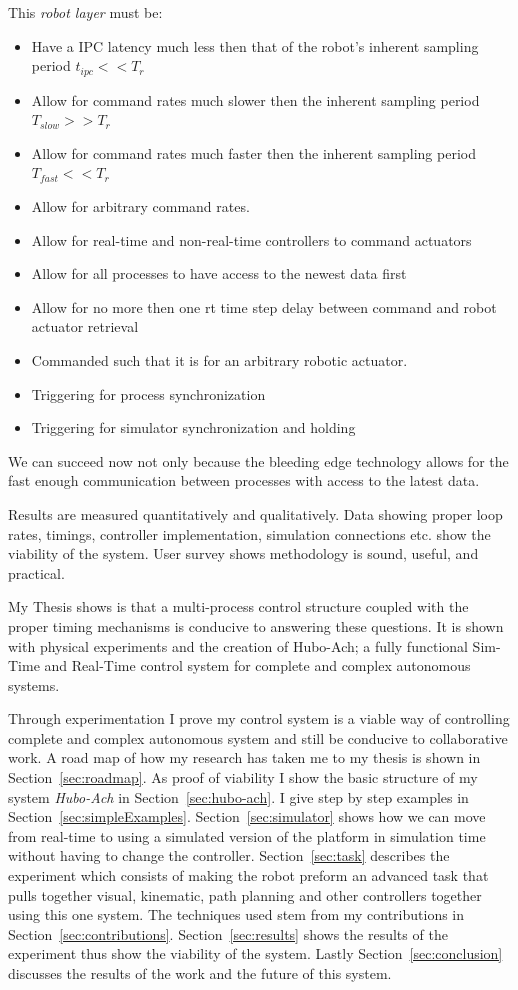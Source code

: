 This \textit{robot layer} must be:
\begin{itemize}
\item Have a IPC latency much less then that of the robot's inherent sampling period $t_{ipc}<<T_{r}$
\item Allow for command rates much slower then the inherent sampling period $T_{slow}>>T_{r}$
\item Allow for command rates much faster then the inherent sampling period $T_{fast}<<T_{r}$
\item Allow for arbitrary command rates.
\item Allow for real-time and non-real-time controllers to command actuators
\item Allow for all processes to have access to the newest data first
\item Allow for no more then one rt time step delay between command and robot actuator retrieval
\item Commanded such that it is for an arbitrary robotic actuator.
\item Triggering for process synchronization
\item Triggering for simulator synchronization and holding
\end{itemize}
We can succeed now not only because the bleeding edge technology allows for the fast enough communication between processes with access to the latest data.

Results are measured quantitatively and qualitatively.
Data showing proper loop rates, timings, controller implementation, simulation connections etc. show the viability of the system.
User survey shows methodology is sound, useful, and practical.





My Thesis shows is that a multi-process control structure coupled with the proper timing mechanisms is conducive to answering these questions.
It is shown with physical experiments and the creation of Hubo-Ach\cite{lofaroRAM2013}; a fully functional Sim-Time and Real-Time control system for complete and complex autonomous systems.

Through experimentation I prove my control system is a viable way of controlling complete and complex autonomous system and still be conducive to collaborative work.  
A road map of how my research has taken me to my thesis is shown in Section~\ref{sec:roadmap}.
As proof of viability I show the basic structure of my system \textit{Hubo-Ach} in Section~\ref{sec:hubo-ach}.  
I give step by step examples in Section~\ref{sec:simpleExamples}.
Section~\ref{sec:simulator} shows how we can move from real-time to using a simulated version of the platform in simulation time without having to change the controller.
Section~\ref{sec:task} describes the experiment which consists of making the robot preform an advanced task that pulls together visual, kinematic, path planning and other controllers together using this one system.
The techniques used stem from my contributions in Section~\ref{sec:contributions}.
Section~\ref{sec:results} shows the results of the experiment thus show the viability of the system.
Lastly Section~\ref{sec:conclusion} discusses the results of the work and the future of this system.

